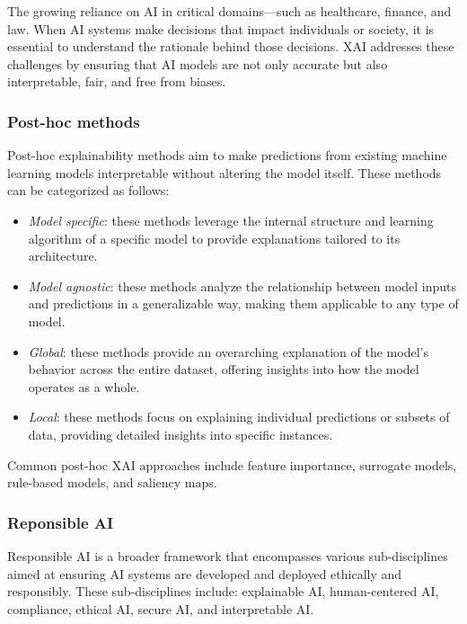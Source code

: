 The growing reliance on AI in critical domains—such as healthcare, finance, and law.
When AI systems make decisions that impact individuals or society, it is essential to understand the rationale behind those decisions. 
XAI addresses these challenges by ensuring that AI models are not only accurate but also interpretable, fair, and free from biases.

\subsubsection{Post-hoc methods}
Post-hoc explainability methods aim to make predictions from existing machine learning models interpretable without altering the model itself. 
These methods can be categorized as follows:
\begin{itemize}
    \item \textit{Model specific}: these methods leverage the internal structure and learning algorithm of a specific model to provide explanations tailored to its architecture.
    \item \textit{Model agnostic}: these methods analyze the relationship between model inputs and predictions in a generalizable way, making them applicable to any type of model.
    \item \textit{Global}: these methods provide an overarching explanation of the model's behavior across the entire dataset, offering insights into how the model operates as a whole.
    \item \textit{Local}: these methods focus on explaining individual predictions or subsets of data, providing detailed insights into specific instances.
\end{itemize}
\noindent Common post-hoc XAI approaches include feature importance, surrogate models, rule-based models, and saliency maps. 

\subsubsection{Reponsible AI}
Responsible AI is a broader framework that encompasses various sub-disciplines aimed at ensuring AI systems are developed and deployed ethically and responsibly. 
These sub-disciplines include: explainable AI, human-centered AI, compliance, ethical AI, secure AI, and interpretable AI. 